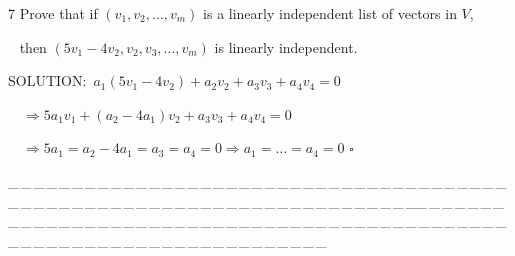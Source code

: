 \documentclass[a4paper, 11pt, UTF8]{article}
\begin{document}
\begin{large}
{\timesbf\Large 7} {\timessl\Large 
Prove that if $(v_1,v_2,\dots,v_m)$ is a linearly independent list of vectors in $V$,}\par\,\,\,
{\timessl\Large then $(5v_1-4v_2,v_2, v_3,\dots,v_m)$ is linearly independent.
}\par
{\timesbf S\footnotesize{OLUTION:}}\,\,\,$a_1(5v_1-4v_2)+a_2 v_2+a_3 v_3+a_4 v_4=0$\par\qquad\quad\,\,\,\,
$\Rightarrow 5a_1 v_1+(a_2-4a_1)v_2+a_3 v_3+a_4 v_4=0$\par\qquad\quad\,\,\,\,
$\Rightarrow 5a_1=a_2-4a_1=a_3=a_4=0\Rightarrow a_1=\dots=a_4=0\,\,\square$\par
{\tiny \_\,\_\,\_\,\_\,\_\,\_\,\_\,\_\,\_\,\_\,\_\,\_\,\_\,\_\,\_\,\_\,\_\,\_\,\_\,\_\,\_\,\_\,\_\,\_\,\_\,\_\,\_\,\_\,\_\,\_\,\_\,\_\,\_\,\_\,\_\,\_\,\_\,\_\,\_\,\_\,\_\,\_\,\_\,\_\,\_\,\_\,\_\,\_\,\_\,\_\,\_\,\_\,\_\,\_\,\_\,\_\,\_\,\_\,\_\,\_\,\_\,\_\,\_\,\_\,\_\,\_\,\_\,\_\,\_\,\_\,\_\_\,\_\,\_\,\_\,\_\,\_\,\_\,\_\,\_\,\_\,\_\,\_\,\_\,\_\,\_\,\_\,\_\,\_\,\_\,\_\,\_\,\_\,\_\,\_\,\_\,\_\,\_\,\_\,\_\,\_\,\_\,\_\,\_\,\_\,\_\,\_\,\_\,\_\,\_\,\_\,\_\,\_\,\_\,\_\,\_\,\_\,\_\,\_\,\_\,\_\,\_\,\_\,\_\,\_\,\_\,\_\,\_\,\_\,\_\,\_\,\_\,\_\,\_\,\_\,\_\,\_\,\_\,\_\,\_\,\_\,\_}\par


\end{large}
\end{document}

